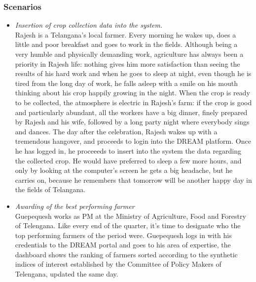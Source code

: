 \documentclass[10pt]{article}
\begin{document}
\subsubsection{Scenarios}
\begin{itemize}
    \item \textit{Insertion of crop collection data into the system.}\\ 
    Rajesh is a Telangana's local farmer. Every morning he wakes up, does a little and poor breakfast and goes to work in the fields.
    Although being a very humble and physically demanding work, agriculture has always been a priority in Rajesh life: nothing gives him
    more satisfaction than seeing the results of his hard work and when he goes to sleep at night, even though he is tired from the long day of work,
    he falls asleep with a smile on his mouth thinking about his crop happily growing in the night. When the crop is ready to be collected, the atmosphere
    is electric in Rajesh's farm: if the crop is good and particularly abundant, all the workers have a big dinner, finely prepared by Rajesh and his wife,
    followed by a long party night where everybody sings and dances. The day after the celebration, Rajesh wakes up with a tremendous hangover, and proceeds
    to login into the DREAM platform. Once he has logged in, he proceeeds to insert into the system the data regarding the collected crop.
    He would have preferred to sleep a few more hours, and only by looking at the computer's screen he gets a big headache, but he carries on, because he
    remembers that tomorrow will be another happy day in the fields of Telangana.
    \item \textit{Awarding of the best performing farmer}\\
    Guepequesh works as PM at the Ministry of Agriculture, Food and Forestry of Telengana. Like every end of the quarter,
     it's time to designate who the top performing farmers of the period were. Guepequesh logs in with his credentials to
      the DREAM portal and goes to his area of expertise, the dashboard shows the ranking of farmers sorted according to 
      the synthetic indices of interest established by the Committee of Policy Makers of Telengana, updated the same day. 

\end{itemize}
\end{document}
